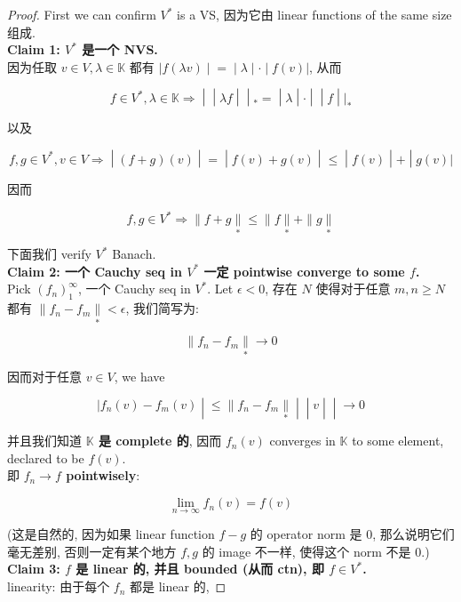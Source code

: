 \documentclass{qlnotes-export}
\begin{document}
\begin{proof}

First we can confirm \(V^{\ast}\) is a VS, 因为它由 linear functions of the same size 组成.\\
\textbf{Claim 1: \(V^{\ast}\) 是一个 NVS.}\\
因为任取 \(v \in V,\lambda \in {\mathbb{K}}\) 都有 \(\left. |f(\lambda v) \middle| = \middle| \lambda \middle| \cdot \middle| f(v)| \right.\), 从而

\[\left. f \in V^{\ast},\lambda \in {\mathbb{K}}\Longrightarrow \middle| \middle| \lambda f \middle| \middle| {}_{\ast} = \middle| \lambda \middle| \cdot \middle| \middle| f \middle| |_{\ast} \right.\]

以及

\[\left. f,g \in V^{\ast},v \in V\Longrightarrow \middle| (f + g)(v) \middle| = \middle| f(v) + g(v) \middle| \leq \middle| f(v) \middle| + \middle| g(v)| \right.\]

因而

\[f,g \in V^{\ast}\Longrightarrow \parallel f + g\underset{\ast}{\parallel} \leq \parallel f\underset{\ast}{\parallel} + \parallel g\underset{\ast}{\parallel}\]

下面我们 verify \(V^{\ast}\) Banach.\\
\textbf{Claim 2: 一个 Cauchy seq in \(V^{\ast}\) 一定 pointwise converge to some \(f\).}\\
Pick \((f_{n})_{1}^{\infty}\), 一个 Cauchy seq in \(V^{\ast}\). Let \(\epsilon < 0\), 存在 \(N\) 使得对于任意 \(m,n \geq N\) 都有 \(\parallel f_{n} - f_{m}\underset{\ast}{\parallel} < \epsilon\), 我们简写为:

\[\parallel f_{n} - f_{m}\underset{\ast}{\parallel}\rightarrow 0\]

因而对于任意 \(v \in V\), we have

\[\left. |f_{n}(v) - f_{m}(v) \middle| \leq \parallel f_{n} - f_{m}\underset{\ast}{\parallel} \middle| \middle| v \middle| \middle| \rightarrow 0 \right.\]

并且我们知道 \textbf{\(\mathbb{K}\) 是 complete 的}, 因而 \(f_{n}(v)\) converges in \(\mathbb{K}\) to some element, declared to be \(f(v)\).\\
即 \textbf{\(f_{n}\rightarrow f\) pointwisely}:

\[\lim\limits_{n\rightarrow\infty}f_{n}(v) = f(v)\]

(这是自然的, 因为如果 linear function \(f - g\) 的 operator norm 是 \(0\), 那么说明它们毫无差别, 否则一定有某个地方 \(f,g\) 的 image 不一样, 使得这个 norm 不是 \(0\).)\\
\textbf{Claim 3: \(f\) 是 linear 的, 并且 bounded (从而 ctn), 即 \(f \in V^{\ast}\).}\\
linearity: 由于每个 \(f_{n}\) 都是 linear 的,


\end{proof}
\end{document}
